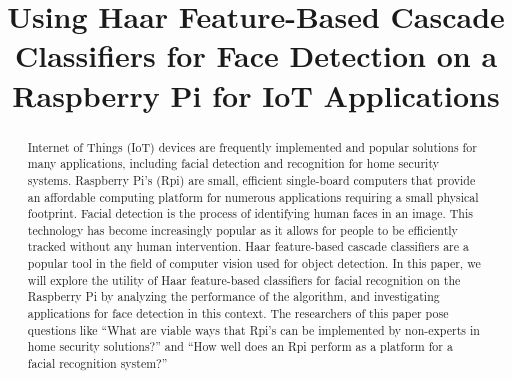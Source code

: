 \documentclass[conference]{IEEEtran}
\begin{document}
\title{Using Haar Feature-Based Cascade Classifiers for Face Detection on a Raspberry Pi for IoT Applications}

\author{
\and
{}
\and
{}
}

\maketitle

\begin{abstract}

Internet of Things (IoT) devices are frequently implemented and popular solutions for many applications, including facial detection and recognition for home security systems. \cite{OneRadzi} Raspberry Pi’s (Rpi) are small, efficient single-board computers that provide an affordable computing platform for numerous applications requiring a small physical footprint. \cite{TwoNayyar} Facial detection is the process of identifying human faces in an image. This technology has become increasingly popular as it allows for people to be efficiently tracked without any human intervention. \cite{SevenKatsanis} Haar feature-based cascade classifiers are a popular tool in the field of computer vision used for object detection. In this paper, we will explore the utility of Haar  feature-based classifiers for facial recognition on the Raspberry Pi by analyzing the performance of the algorithm, and investigating applications for face detection in this context. The researchers of this paper pose questions like “What are viable ways that Rpi’s can be implemented by non-experts in home security solutions?” and “How well does an Rpi perform as a platform for a facial recognition system?”
\end{abstract}
\end{document}
